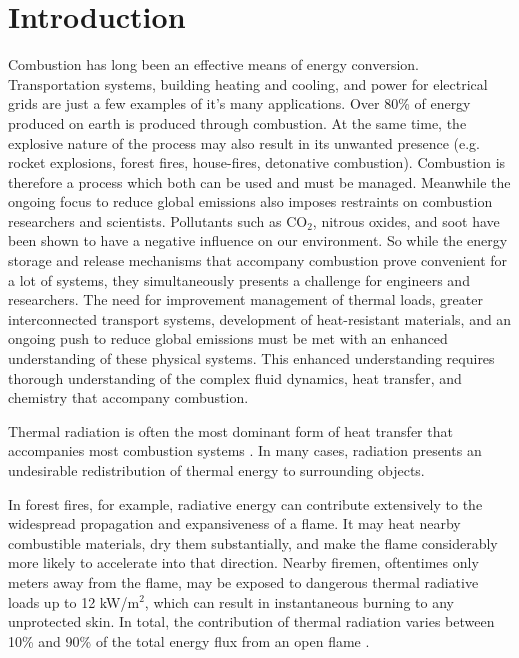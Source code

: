 \addchapheadtotoc

\chapter{Introduction} \label{chapter:Introduction}
Combustion has long been an effective means of energy conversion. Transportation systems, building heating and cooling, and power for electrical grids are just a few examples of it's many applications. Over 80\% of energy produced on earth is produced through combustion. 
At the same time, the explosive nature of the process may also result in its unwanted presence (e.g. rocket explosions, forest fires, house-fires, detonative combustion).
Combustion is therefore a process which both can be used and must be managed. 
Meanwhile the ongoing focus to reduce global emissions also imposes restraints on combustion researchers and scientists. Pollutants such as CO${}_2$, nitrous oxides, and soot have been shown to have a negative influence on our environment.
So while the energy storage and release mechanisms that accompany combustion prove convenient for a lot of systems, they simultaneously presents a challenge for engineers and researchers.
The need for improvement management of thermal loads, greater interconnected transport systems, development of heat-resistant materials, and an ongoing push to reduce global emissions must be met with an enhanced understanding of these physical systems.
This enhanced understanding requires thorough understanding of the complex fluid dynamics, heat transfer, and chemistry that accompany combustion.

Thermal radiation is often the most dominant form of heat transfer that accompanies most combustion systems \cite{Coelho2018RadiativeSystems}. In many cases, radiation presents an undesirable redistribution of thermal energy to surrounding objects.

In forest fires, for example, radiative energy can contribute extensively to the widespread propagation and expansiveness of a flame. 
It may heat nearby combustible materials, dry them substantially, and make the flame considerably more likely to accelerate into that direction. 
Nearby firemen, oftentimes only meters away from the flame, may be exposed to dangerous thermal radiative loads up to 12 kW/m$^2$, which can result in instantaneous burning to any unprotected skin.
In total, the contribution of thermal radiation varies between 10\% and 90\% of the total energy flux from an open flame \cite{Valendik:2008vo}.

